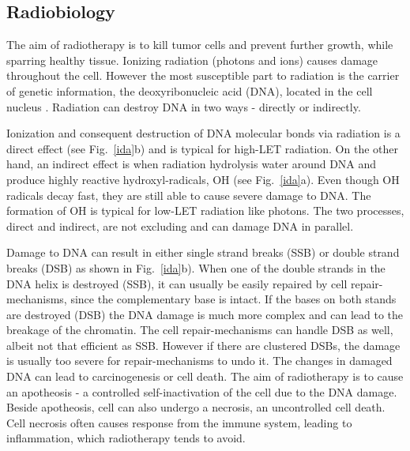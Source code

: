 \documentclass[type=dr, dr=rernat, accentcolor=tud7b,colorbacktitle, bigchapter, openright, twoside, 12pt ]{tudthesis}
\begin{document}
\subsection{Radiobiology}

The aim of radiotherapy is to kill tumor cells and prevent further growth, while sparring healthy tissue. Ionizing radiation (photons and ions) causes damage throughout the cell. However the most susceptible part to radiation is the
carrier of genetic information, the deoxyribonucleic acid (DNA), located in the cell nucleus \cite{Munro1970}. Radiation can destroy DNA in two ways - directly or indirectly.

Ionization and consequent destruction of DNA molecular bonds via radiation is a direct effect (see Fig.~\ref{ida}b) and is typical for high-LET radiation. On the other hand, an indirect effect is when radiation hydrolysis water around DNA and produce highly reactive hydroxyl-radicals, OH 
(see Fig.~\ref{ida}a). Even though OH radicals decay fast, they are still able to cause severe damage to DNA. The formation of OH is typical for low-LET radiation like photons. The two processes, direct and indirect, are not excluding and can damage DNA in parallel.

Damage to DNA can result in either single strand breaks (SSB) or double strand breaks (DSB) as shown in Fig.~\ref{ida}b). When one of the double strands in the DNA helix is destroyed (SSB), it can usually be easily repaired by cell 
repair-mechanisms, since the complementary base is intact. If the bases on both stands are destroyed (DSB) the DNA damage is much more complex and can lead to the breakage of the chromatin. The cell repair-mechanisms can handle DSB as well, 
albeit not that efficient as SSB. However if there are clustered DSBs, the damage is usually too severe for repair-mechanisms to undo it. The changes in damaged DNA can lead to carcinogenesis or cell death. The aim of radiotherapy is to 
cause an apotheosis - a controlled self-inactivation of the cell due to the DNA damage. Beside apotheosis, cell can also undergo a necrosis, an uncontrolled cell death. Cell necrosis often causes response from the immune system, leading to inflammation, which
radiotherapy tends to avoid.
\end{document}
